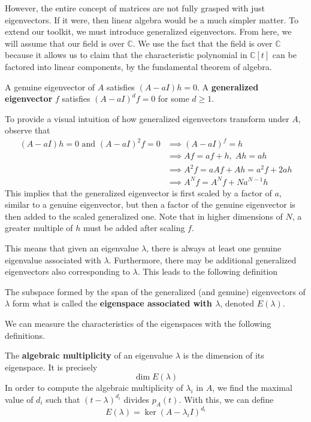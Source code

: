  However, the entire concept of matrices are not fully grasped with just eigenvectors. If it were, then linear algebra would be a much simpler matter. To extend our toolkit, we must introduce generalized eigenvectors. From here, we will assume that our field is over $\mathbb{C}$. We use the fact that the field is over $\mathbb{C}$ because it allows us to claim that the characteristic polynomial in $\mathbb{C}[t]$ can be factored into linear components, by the fundamental theorem of algebra. 

  \begin{definition}
  A genuine eigenvector of $A$ satisfies $(A-aI)h = 0$. A \textbf{generalized eigenvector} $f$ satisfies $(A-a I)^{d} f = 0$ for some $d \geq 1$. 
  \end{definition}

  To provide a visual intuition of how generalized eigenvectors transform under $A$, observe that 
  \begin{align}
      (A - aI) h = 0 \text{ and } (A - aI)^2 f = 0 & \implies (A - aI)^f = h \\
      & \implies A f = a f + h, \; Ah = ah \\
      & \implies A^2 f = a A f + A h = a^2 f + 2 a h \\
      & \implies A^N f = A^N f + N a^{N-1} h 
  \end{align}
  This implies that the generalized eigenvector is first scaled by a factor of $a$, similar to a genuine eigenvector, but then a factor of the genuine eigenvector is then added to the scaled generalized one. Note that in higher dimensions of $N$, a greater multiple of $h$ must be added after scaling $f$. 

  This means that given an eigenvalue $\lambda$, there is always at least one genuine eigenvalue associated with $\lambda$. Furthermore, there may be additional generalized eigenvectors also corresponding to $\lambda$. This leads to the following definition

  \begin{definition}
  The subspace formed by the span of the generalized (and genuine) eigenvectors of $\lambda$ form what is called the \textbf{eigenspace associated with $\lambda$}, denoted $E(\lambda)$. 
  \end{definition}

  We can measure the characteristics of the eigenspaces with the following definitions. 

  \begin{definition}
  The \textbf{algebraic multiplicity} of an eigenvalue $\lambda$ is the dimension of its eigenspace. It is precisely
  \[\dim{E(\lambda)}\]  
  In order to compute the algebraic multiplicity of $\lambda_i$ in $A$, we find the maximal value of $d_i$ such that $(t-\lambda)^{d_i}$ divides $p_A (t)$. With this, we can define 
  \[E(\lambda) = \ker{(A - \lambda_i I)^{d_i}}\]
  \end{definition} 

